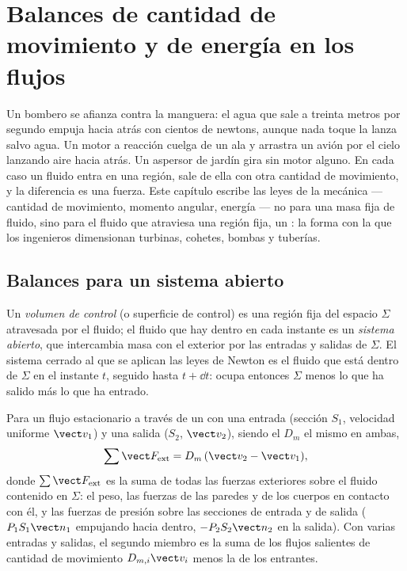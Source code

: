 \chapter{Balances de cantidad de movimiento y de energía en los flujos}\label{ch:b2:flow-balances}

Un bombero se afianza contra la manguera: el agua que sale a treinta
metros por segundo empuja hacia atrás con cientos de newtons, aunque nada
toque la lanza salvo agua. Un motor a reacción cuelga de un ala y arrastra
un avión por el cielo lanzando aire hacia atrás. Un aspersor de jardín
gira sin motor alguno. En cada caso un fluido entra en una región, sale de
ella con otra cantidad de movimiento, y la diferencia es una fuerza. Este
capítulo escribe las leyes de la mecánica --- cantidad de movimiento,
momento angular, energía --- no para una masa fija de fluido, sino para el
fluido que atraviesa una región fija, un \emph{}: la forma
con la que los ingenieros dimensionan turbinas, cohetes, bombas y tuberías.

\section{Balances para un sistema abierto}

\begin{definition}\label{def:b2:flow-balances:cv}
Un \emph{volumen de control} (o superficie de control) es una región fija
del espacio $\Sigma$ atravesada por el fluido; el fluido que hay dentro en
cada instante es un \emph{sistema abierto}, que intercambia masa con el
exterior por las entradas y salidas de $\Sigma$. El sistema cerrado al que
se aplican las leyes de Newton es el fluido que está dentro de $\Sigma$ en
el instante $t$, seguido hasta $t + \dd t$: ocupa entonces $\Sigma$ menos
lo que ha salido más lo que ha entrado.
\end{definition}

\begin{theorem}\label{thm:b2:flow-balances:momentum}
Para un flujo estacionario a través de un  con una
entrada (sección $S_1$, velocidad uniforme $\vect v_1$) y una salida
($S_2$, $\vect v_2$), siendo el  $D_m$ el mismo en ambas,
\[
\sum\vect F_{\text{ext}} = D_m\,(\vect v_2 - \vect v_1) ,
\]
donde $\sum\vect F_{\text{ext}}$ es la suma de todas las fuerzas exteriores
sobre el fluido contenido en $\Sigma$: el peso, las fuerzas de las paredes
y de los cuerpos en contacto con él, y las fuerzas de presión sobre las
secciones de entrada y de salida ($P_1S_1\vect n_1$ empujando hacia dentro,
$-P_2S_2\vect n_2$ en la salida). Con varias entradas y salidas, el segundo
miembro es la suma de los flujos salientes de cantidad de movimiento
$D_{m,i}\vect v_i$ menos la de los entrantes.
\end{theorem}

